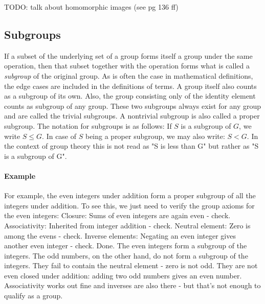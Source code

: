 
TODO: talk about homomorphic images (see \cite{ABoAA} pg 136 ff)
















\subsection{Subgroups}
If a subset of the underlying set of a group forms itself a group under the same operation, then that subset together with the operation forms what is called a \emph{subgroup} of the original group. As is often the case in mathematical definitions, the edge cases are included in the definitions of terms. A group itself also counts as a subgroup of its own. Also, the group consisting only of the identity element counts as subgroup of any group. These two subgroups always exist for any group and are called the trivial subgroups. A nontrivial subgroup is also called a proper subgroup. The notation for subgroups is as follows: If $S$ is a subgroup of $G$, we write $S \leq G$. In case of $S$ being a proper subgroup, we may also write: $S < G$. In the context of group theory this is not read as "S is less than G" but rather as "S is a subgroup of G".


\paragraph{Example}
For example, the even integers under addition form a proper subgroup of all the integers under addition. To see this, we just need to verify the group axioms for the even integers: Closure: Sums of even integers are again even - check. Associativity: Inherited from integer addition - check. Neutral element: Zero is among the evens - check. Inverse elements: Negating an even integer gives another even integer - check. Done. The even integers form a subgroup of the integers. The odd numbers, on the other hand, do not form a subgroup of the integers. They fail to contain the neutral element - zero is not odd. They are not even closed under addition: adding two odd numbers gives an even number. Associativity works out fine and inverses are also there - but that's not enough to qualify as a group. 

